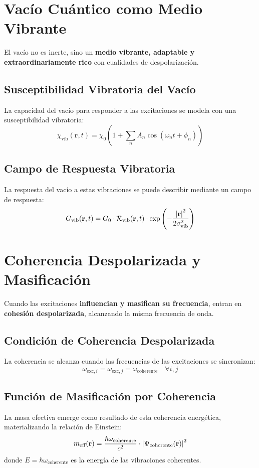 \documentclass{book} %
\begin{document}
\section{Vacío Cuántico como Medio Vibrante}
El vacío no es inerte, sino un \textbf{medio vibrante, adaptable y extraordinariamente rico} con cualidades de despolarización.

\subsection{Susceptibilidad Vibratoria del Vacío}
La capacidad del vacío para responder a las excitaciones se modela con una susceptibilidad vibratoria:
\begin{equation}
\chi_{\text{vib}}(\mathbf{r},t) = \chi_0 \left(1 + \sum_n A_n \cos(\omega_n t + \phi_n)\right)
\end{equation}

\subsection{Campo de Respuesta Vibratoria}
La respuesta del vacío a estas vibraciones se puede describir mediante un campo de respuesta:
\begin{equation}
G_{\text{vib}}(\mathbf{r},t) = G_0 \cdot \mathcal{R}_{\text{vib}}(\mathbf{r},t) \cdot \exp\left(-\frac{\abs{\mathbf{r}}^2}{2\sigma_{\text{vib}}^2}\right)
\end{equation}

\section{Coherencia Despolarizada y Masificación}
Cuando las excitaciones \textbf{influencian y masifican su frecuencia}, entran en \textbf{cohesión despolarizada}, alcanzando la misma frecuencia de onda.

\subsection{Condición de Coherencia Despolarizada}
La coherencia se alcanza cuando las frecuencias de las excitaciones se sincronizan:
\begin{equation}
\omega_{\text{exc},i} = \omega_{\text{exc},j} = \omega_{\text{coherente}} \quad \forall i,j
\end{equation}

\subsection{Función de Masificación por Coherencia}
La masa efectiva emerge como resultado de esta coherencia energética, materializando la relación de Einstein:
\begin{equation}
m_{\text{eff}}(\mathbf{r}) = \frac{\hbar\omega_{\text{coherente}}}{c^2} \cdot \abs{\Psi_{\text{coherente}}(\mathbf{r})}^2
\end{equation}
donde $E = \hbar\omega_{\text{coherente}}$ es la energía de las vibraciones coherentes.
\end{document}
